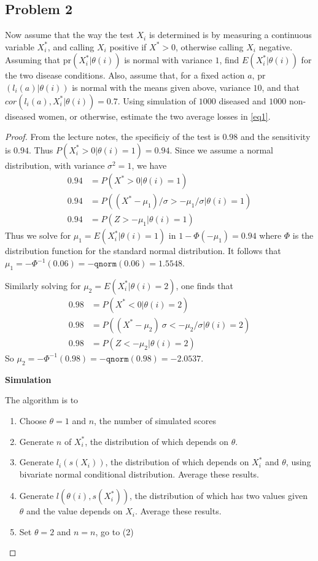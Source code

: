 \documentclass[letterpaper, 12pt]{article}\usepackage[]{graphicx}\usepackage[]{color}
\begin{document}
\subsection*{Problem 2}
Now assume that the way the test $X_i$ is determined is by measuring a continuous variable $X_i^*$, and calling $X_i$ positive if $X^* > 0$, otherwise calling $X_i$ negative. Assuming that pr$(X_i^* | \theta(i))$ is normal with variance $1$, find $E(X_i^*|\theta(i))$ for the two disease conditions. 
Also, assume that, for a fixed action $a$, pr$(l_i(a) | \theta(i))$ is normal with the means given above, variance $10$, and that $cor(l_i(a),X_i^*|\theta(i))=0.7$.
 Using simulation of $1000$ 	diseased and $1000$ non-diseased women, or otherwise, estimate the two average losses in \eqref{eq1}.

\begin{proof}
From the lecture notes, the specificiy of the test is $0.98$ and the sensitivity is $0.94$. Thus $P( X_i^* > 0 | \theta(i) = 1) = 0.94$. Since we assume a normal distribution, with variance $\sigma^2 = 1$, we have
\begin{align*}
0.94 &= P( X^* > 0 | \theta(i) = 1) \\
0.94 &= P( (X^* - \mu_1) / \sigma > -\mu_1/ \sigma | \theta(i) = 1) \\
0.94 &= P( Z > -\mu_1 | \theta(i) = 1)
\end{align*}
Thus we solve for $\mu_1 = E(X_i^* | \theta(i)=1)$ in $1 - \Phi(-\mu_1) = 0.94$ where $\Phi$ is the distribution function for the standard normal distribution. It follows that $\mu_1 = -\Phi^{-1} (0.06) = - \texttt{qnorm}(0.06) = 1.5548$. 

Similarly solving for $\mu_2 = E(X_i^* | \theta(i) = 2)$, one finds that
\begin{align*}
0.98 &= P(X^* < 0 | \theta(i) = 2) \\
0.98 &= P((X^* - \mu_2) \ \sigma < -\mu_2 / \sigma | \theta(i) = 2) \\
0.98 &= P( Z < -\mu_2 | \theta(i) = 2)
\end{align*}
So $\mu_2 = -\Phi^{-1}(0.98) = -\texttt{qnorm}(0.98) = -2.0537$.

\textbf{Simulation}

The algorithm is to 
\begin{enumerate}[(1)]
\item
Choose $\theta= 1$ and $n$, the number of simulated scores
\item
Generate $n$ of $X_i^*$, the distribution of which depends on $\theta$.
\item
Generate $l_i(s(X_i))$, the distribution of which depends on $X_i^*$ and $\theta$, using bivariate normal conditional distribution. Average these results.
\item
Generate $l(\theta(i), s(X_i^*))$, the distribution of which has two values given $\theta$ and the value depends on $X_i$. Average these results.
\item
Set $\theta = 2$ and $n=n$, go to (2)


\end{enumerate}
\end{proof}
\end{document}
